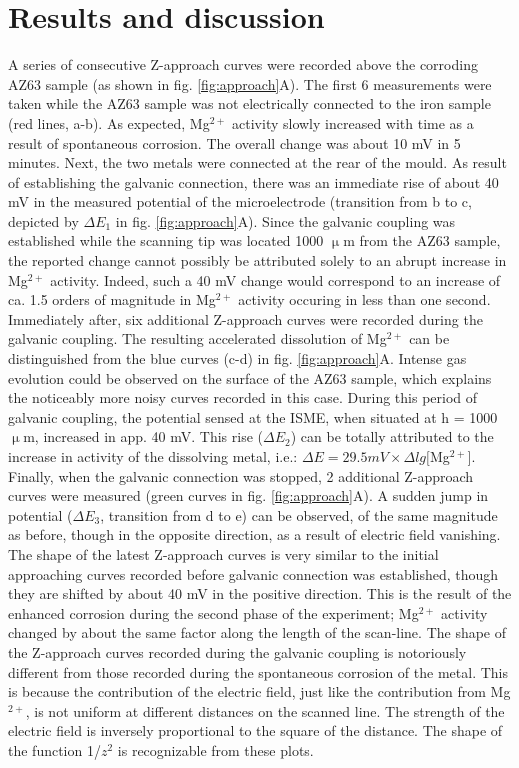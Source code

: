 \documentclass[3p]{elsarticle}
\begin{document}
\section{Results and discussion}

A series of consecutive Z-approach curves were recorded above the corroding AZ63 sample (as shown in fig. \ref{fig:approach}A). The first 6 measurements were taken while the AZ63 sample was not electrically connected to the iron sample (red lines, a-b). As expected, Mg$^{2+}$ activity slowly increased with time as a result of spontaneous corrosion. The overall change was about 10 mV in 5 minutes. Next, the two metals were connected at the rear of the mould. As result of establishing the galvanic connection, there was an immediate rise of about 40 mV in the measured potential of the microelectrode (transition from b to c, depicted by $\Delta E_1$ in fig. \ref{fig:approach}A). Since the galvanic coupling was established while the scanning tip was located 1000 $\upmu$m from the AZ63 sample, the reported change cannot possibly be attributed solely to an abrupt increase in Mg$^{2+}$ activity. Indeed, such a 40 mV change would correspond to an increase of ca. 1.5 orders of magnitude in Mg$^{2+}$ activity occuring in less than one second. Immediately after, six additional Z-approach curves were recorded during the galvanic coupling. The resulting accelerated dissolution of Mg$^{2+}$ can be distinguished from the blue curves (c-d) in fig. \ref{fig:approach}A. Intense gas evolution could be observed on the surface of the AZ63 sample, which explains the noticeably more noisy curves recorded in this case. During this period of galvanic coupling, the potential sensed at the ISME, when situated at h = 1000 $\upmu$m, increased in app. 40 mV. This rise ($\Delta E_2$) can be totally attributed to the increase in activity of the dissolving metal, i.e.: $\Delta E = 29.5 mV \times \Delta lg[$Mg$^{2+}]$. Finally, when the galvanic connection was stopped, 2 additional Z-approach curves were measured (green curves in fig. \ref{fig:approach}A). A sudden jump in potential ($\Delta E_3$, transition from d to e) can be observed, of the same magnitude as before, though in the opposite direction, as a result of electric field vanishing. The shape of the latest Z-approach curves is very similar to the initial approaching curves recorded before galvanic connection was established, though they are shifted by about 40 mV in the positive direction. This is the result of the enhanced corrosion during the second phase of the experiment; Mg$^{2+}$ activity changed by about the same factor along the length of the scan-line. The shape of the Z-approach curves recorded during the galvanic coupling is notoriously different from those recorded during the spontaneous corrosion of the metal. This is because the contribution of the electric field, just like the contribution from Mg$^{2+}$, is not uniform at different distances on the scanned line. The strength of the electric field is inversely proportional to the square of the distance. The shape of the function 1/$z^2$ is recognizable from these plots.
\end{document}
